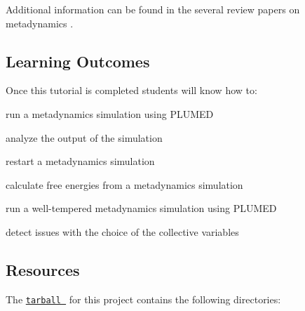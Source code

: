 Additional information can be found in the several review papers on metadynamics \cite{gerv-laio09review} \cite{WCMS:WCMS31} \cite{WCMS:WCMS1103}.\hypertarget{belfast-6_belfast-6-learning-outcomes}{}\subsection{Learning Outcomes}\label{belfast-6_belfast-6-learning-outcomes}
Once this tutorial is completed students will know how to\+:


\begin{DoxyItemize}
\item run a metadynamics simulation using P\+L\+U\+M\+E\+D
\item analyze the output of the simulation
\item restart a metadynamics simulation
\item calculate free energies from a metadynamics simulation
\item run a well-\/tempered metadynamics simulation using P\+L\+U\+M\+E\+D
\item detect issues with the choice of the collective variables
\end{DoxyItemize}\hypertarget{belfast-6_belfast-6-resources}{}\subsection{Resources}\label{belfast-6_belfast-6-resources}
The \href{tutorial-resources/belfast-6.tar.gz}{\tt tarball } for this project contains the following directories\+:


